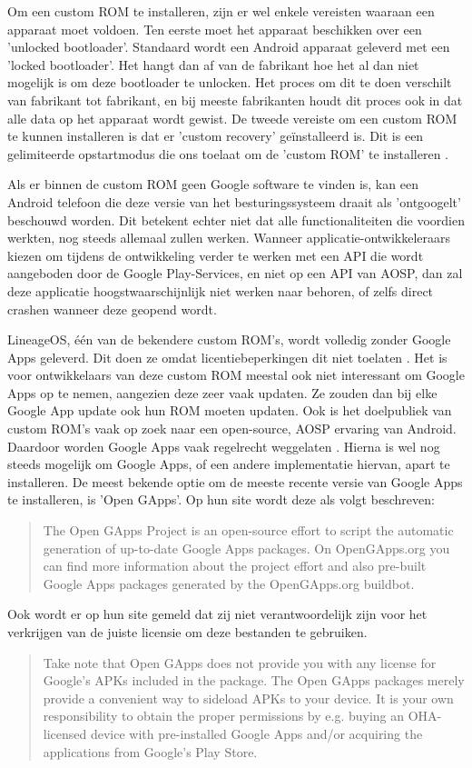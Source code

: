 Om een custom ROM te installeren, zijn er wel enkele vereisten waaraan een apparaat moet voldoen. Ten eerste moet het apparaat beschikken over een 'unlocked bootloader'. Standaard wordt een Android apparaat geleverd met een 'locked bootloader'. Het hangt dan af van de fabrikant hoe het al dan niet mogelijk is om deze bootloader te unlocken. Het proces om dit te doen verschilt van fabrikant tot fabrikant, en bij meeste fabrikanten houdt dit proces ook in dat alle data op het apparaat wordt gewist. De tweede vereiste om een custom ROM te kunnen installeren is dat er 'custom recovery' geïnstalleerd is. Dit is een gelimiteerde opstartmodus die ons toelaat om de 'custom ROM' te installeren \autocite{hoffman_custom-recovery}.

Als er binnen de custom ROM geen Google software te vinden is, kan een Android telefoon die deze versie van het besturingssysteem draait als 'ontgoogelt' beschouwd worden. Dit betekent echter niet dat alle functionaliteiten die voordien werkten, nog steeds allemaal zullen werken. Wanneer applicatie-ontwikkeleraars kiezen om tijdens de ontwikkeling verder te werken met een API die wordt aangeboden door de Google Play-Services, en niet op een API van AOSP, dan zal deze applicatie hoogstwaarschijnlijk niet werken naar behoren, of zelfs direct crashen wanneer deze geopend wordt.

LineageOS, één van de bekendere custom ROM's, wordt volledig zonder Google Apps geleverd. Dit doen ze omdat licentiebeperkingen dit niet toelaten \autocite{lineage_google-apps}. Het is voor ontwikkelaars van deze custom ROM meestal ook niet interessant om Google Apps op te nemen, aangezien deze zeer vaak updaten. Ze zouden dan bij elke Google App update ook hun ROM moeten updaten. Ook is het doelpubliek van custom ROM's vaak op zoek naar een open-source, AOSP ervaring van Android. Daardoor worden Google Apps vaak regelrecht weggelaten \autocite{cawley_gapps}. Hierna is wel nog steeds mogelijk om Google Apps, of een andere implementatie hiervan, apart te installeren. De meest bekende optie om de meeste recente versie van Google Apps te installeren, is 'Open GApps'. Op hun site wordt deze als volgt beschreven: \blockcquote{opengapps_about}{
    The Open GApps Project is an open-source effort to script the automatic generation of up-to-date Google Apps packages.
    On OpenGApps.org you can find more information about the project effort and also pre-built Google Apps packages generated by the OpenGApps.org buildbot.
}
Ook wordt er op hun site gemeld dat zij niet verantwoordelijk zijn voor het verkrijgen van de juiste licensie om deze bestanden te gebruiken.
\blockcquote{opengapps_about}{
    Take note that Open GApps does not provide you with any license for Google’s APKs included in the package. The Open GApps packages merely provide a convenient way to sideload APKs to your device. It is your own responsibility to obtain the proper permissions by e.g. buying an OHA-licensed device with pre-installed Google Apps and/or acquiring the applications from Google’s Play Store.
}

